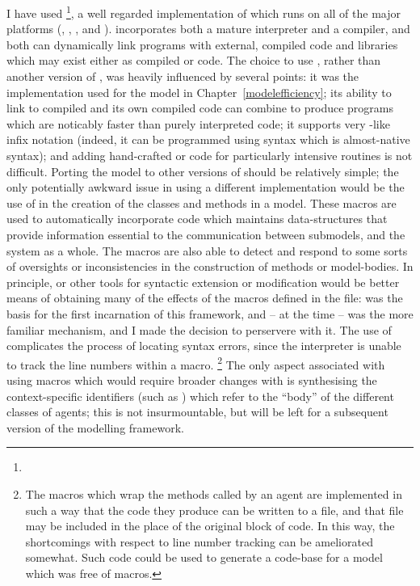 I have used
\GambitC\footnote{}, a well
regarded implementation of \Scheme which runs on all of the major
platforms (\Linux, \Unix, \OSX, \Android and \Windows). \Gambit
incorporates both a mature \Scheme interpreter and a compiler, and
both can dynamically link programs with external, compiled code and
libraries which may exist either as compiled \CC or \Scheme code.  The
choice to use \Gambit, rather than another version of \Scheme,
was heavily influenced by several points: it was the implementation
used for the model in Chapter~\ref{modelefficiency}; its ability to
link to compiled \CC and its own compiled code can combine to produce
programs which are noticably faster than purely interpreted code; it
supports very \CC-like infix notation (indeed, it can be programmed
using syntax which is almost-native \CC syntax); and adding
hand-crafted \CC or \Cpp code for particularly intensive routines is
not difficult.  Porting the model to other versions of \Scheme should
be relatively simple; the only potentially awkward issue in using a
different \Scheme implementation would be the use of \sdefmac in the
creation of the classes and methods in a model.  These macros are used
to automatically incorporate code which maintains data-structures that
provide information essential to the communication between submodels,
and the system as a whole. The macros are also able to detect and
respond to some sorts of oversights or inconsistencies in the
construction of methods or model-bodies.  In principle, \sdefsyntax or
other tools for syntactic extension or modification would be better
means of obtaining many of the effects of the macros defined in the
 file: \sdefmac was the basis for the first
incarnation of this framework, and -- at the time -- was the more
familiar mechanism, and I made the decision to perservere with it. The
use of \sdefmac complicates the process of locating syntax errors,
since the interpreter is unable to track the line numbers within a
macro. \footnote{The macros which wrap the methods called by an agent
  are implemented in such a way that the code they produce can be
  written to a file, and that file may be included in the place of the
  original block of code.  In this way, the shortcomings with respect
  to line number tracking can be ameliorated somewhat.  Such code
  could be used to generate a code-base for a model which was free of
  macros.}  The only aspect associated with using macros which would
require broader changes with \sdefsyntax is synthesising the
context-specific identifiers (such as
) which refer to the ``body'' of the
different classes of agents; this is not insurmountable, but will be
left for a subsequent version of the modelling framework.



